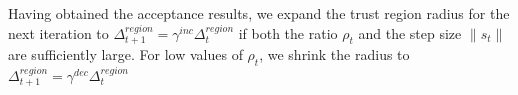 Having obtained the acceptance results, we expand the trust region radius for the next iteration to $\Delta_{t+1}^{region}=\gamma^{inc}\Delta_t^{region}$ if both the ratio $\rho_t$ and the step size $\lVert s_t\rVert$ are sufficiently large. For low values of $\rho_t$, we shrink the radius to $\Delta^{region}_{t+1} = \gamma^{dec}\Delta_t^{region}$
